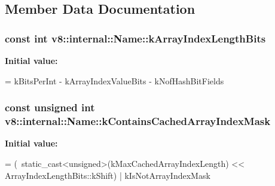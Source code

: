\subsection{Member Data Documentation}
\subsubsection[{\texorpdfstring{k\+Array\+Index\+Length\+Bits}{kArrayIndexLengthBits}}]{\setlength{\rightskip}{0pt plus 5cm}const int v8\+::internal\+::\+Name\+::k\+Array\+Index\+Length\+Bits\hspace{0.3cm}{\ttfamily [static]}}\hypertarget{classv8_1_1internal_1_1_name_a3fdf5618399447d88b8c9a8c2e89339e}{}\label{classv8_1_1internal_1_1_name_a3fdf5618399447d88b8c9a8c2e89339e}
{\bfseries Initial value\+:}
\begin{DoxyCode}
=
      kBitsPerInt - kArrayIndexValueBits - kNofHashBitFields
\end{DoxyCode}
\subsubsection[{\texorpdfstring{k\+Contains\+Cached\+Array\+Index\+Mask}{kContainsCachedArrayIndexMask}}]{\setlength{\rightskip}{0pt plus 5cm}const unsigned int v8\+::internal\+::\+Name\+::k\+Contains\+Cached\+Array\+Index\+Mask\hspace{0.3cm}{\ttfamily [static]}}\hypertarget{classv8_1_1internal_1_1_name_ae0af5213bf45a48b36de81433c7c31ad}{}\label{classv8_1_1internal_1_1_name_ae0af5213bf45a48b36de81433c7c31ad}
{\bfseries Initial value\+:}
\begin{DoxyCode}
=
      (~static\_cast<\textcolor{keywordtype}{unsigned}>(kMaxCachedArrayIndexLength)
       << ArrayIndexLengthBits::kShift) |
      kIsNotArrayIndexMask
\end{DoxyCode}
